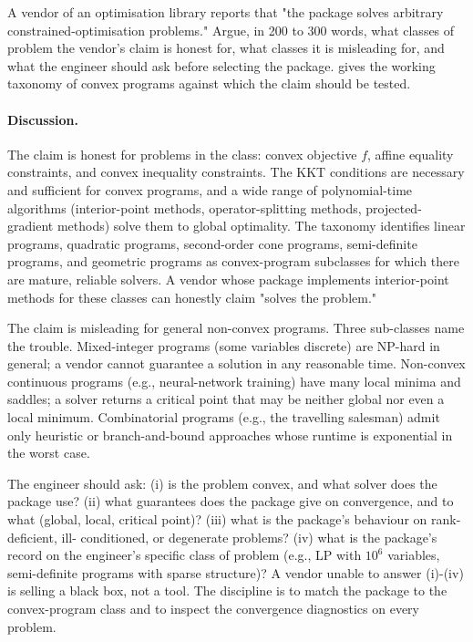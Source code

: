 \begin{exercise}
A vendor of an optimisation library reports that "the package solves
arbitrary constrained-optimisation problems." Argue, in 200 to
300 words, what classes of problem the vendor's claim is honest
for, what classes it is misleading for, and what the engineer
should ask before selecting the package. \textcite{text:boyd-vandenberghe2004}
gives the working taxonomy of convex programs against which the
claim should be tested.

\paragraph{Discussion.} The claim is honest for problems in the
 class: convex objective $f$, affine equality
constraints, and convex inequality constraints. The KKT conditions
are necessary and sufficient for convex programs, and a wide range
of polynomial-time algorithms (interior-point methods,
operator-splitting methods, projected-gradient methods) solve them
to global optimality. The taxonomy \cite{text:boyd-vandenberghe2004}
identifies linear programs, quadratic programs, second-order cone
programs, semi-definite programs, and geometric programs as
convex-program subclasses for which there are mature, reliable
solvers. A vendor whose package implements interior-point methods
for these classes can honestly claim "solves the problem."

The claim is misleading for general non-convex programs. Three
sub-classes name the trouble. Mixed-integer programs (some variables
discrete) are NP-hard in general; a vendor cannot guarantee a
solution in any reasonable time. Non-convex continuous programs
(e.g., neural-network training) have many local minima and saddles;
a solver returns a critical point that may be neither global nor
even a local minimum. Combinatorial programs (e.g., the travelling
salesman) admit only heuristic or branch-and-bound approaches whose
runtime is exponential in the worst case.

The engineer should ask: (i) is the problem convex, and what
solver does the package use? (ii) what guarantees does the package
give on convergence, and to what (global, local, critical point)?
(iii) what is the package's behaviour on rank-deficient, ill-
conditioned, or degenerate problems? (iv) what is the package's
record on the engineer's specific class of problem (e.g., LP with
$10^{6}$ variables, semi-definite programs with sparse structure)?
A vendor unable to answer (i)-(iv) is selling a black box, not a
tool. The discipline is to match the package to the convex-program
class and to inspect the convergence diagnostics on every problem.
\end{exercise}
